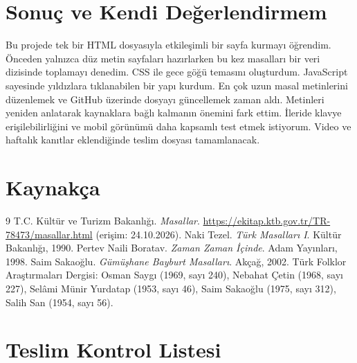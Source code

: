 \documentclass[12pt,a4paper]{article}
\begin{document}
\section{Sonuç ve Kendi Değerlendirmem}


Bu projede tek bir HTML dosyasıyla etkileşimli bir sayfa kurmayı öğrendim. Önceden yalnızca düz metin sayfaları hazırlarken bu kez masalları bir veri dizisinde toplamayı denedim. CSS ile gece göğü temasını oluşturdum. JavaScript sayesinde yıldızlara tıklanabilen bir yapı kurdum. En çok uzun masal metinlerini düzenlemek ve GitHub üzerinde dosyayı güncellemek zaman aldı. Metinleri yeniden anlatarak kaynaklara bağlı kalmanın önemini fark ettim. İleride klavye erişilebilirliğini ve mobil görünümü daha kapsamlı test etmek istiyorum. Video ve haftalık kanıtlar eklendiğinde teslim dosyası tamamlanacak.

\section{Kaynakça}


\begin{thebibliography}{9}
 T.C. Kültür ve Turizm Bakanlığı. \emph{Masallar}. \url{https://ekitap.ktb.gov.tr/TR-78473/masallar.html} (erişim: 24.10.2026).
 Naki Tezel. \emph{Türk Masalları I}. Kültür Bakanlığı, 1990.
 Pertev Naili Boratav. \emph{Zaman Zaman İçinde}. Adam Yayınları, 1998.
 Saim Sakaoğlu. \emph{Gümüşhane Bayburt Masalları}. Akçağ, 2002.
 Türk Folklor Araştırmaları Dergisi: Osman Saygı (1969, sayı 240), Nebahat Çetin (1968, sayı 227), Selâmi Münir Yurdatap (1953, sayı 46), Saim Sakaoğlu (1975, sayı 312), Salih San (1954, sayı 56).

\end{thebibliography}

\appendix
{}
\section{Teslim Kontrol Listesi}
\end{document}
